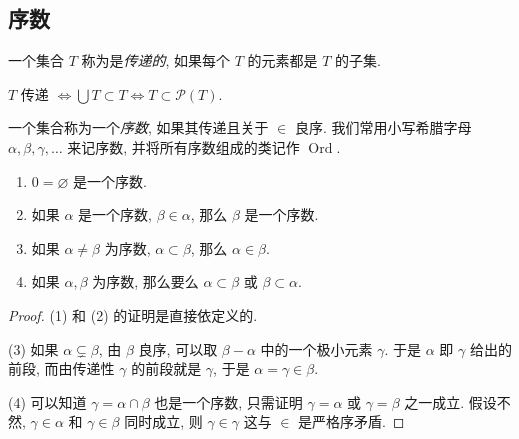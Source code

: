 \subsection{序数}

一个集合 \( T \) 称为是\emph{传递的}, 如果每个 \( T \) 的元素都是 \( T \)
的子集.
\begin{remark}
  \( T \) 传递 \( \iff \bigcup T \subset T \iff T \subset \mathcal{P}(T) \).
\end{remark}
一个集合称为一个\emph{序数}, 如果其传递且关于 \( \in \) 良序.
我们常用小写希腊字母 \( \alpha, \beta, \gamma, \ldots \) 来记序数,
并将所有序数组成的类记作 \( \operatorname{Ord} \).

\begin{lemma}
  \label{lemma-ordinal-number}
  \begin{enumerate}
    \item \( 0 = \varnothing \) 是一个序数.
    \item 如果 \( \alpha \) 是一个序数, \( \beta \in \alpha \), 那么 \( \beta \)
      是一个序数.
    \item 如果 \( \alpha \neq \beta \) 为序数, \( \alpha \subset \beta \), 那么
      \( \alpha \in \beta \).
    \item 如果 \( \alpha, \beta \) 为序数, 那么要么 \( \alpha \subset \beta \)
      或 \( \beta \subset \alpha \).
  \end{enumerate}
\end{lemma}
\begin{proof}
  (1) 和 (2) 的证明是直接依定义的.

  (3) 如果 \( \alpha \subsetneq \beta \), 由 \( \beta \) 良序, 可以取 \( \beta -
  \alpha \) 中的一个极小元素 \( \gamma \).
  于是 \( \alpha \) 即 \( \gamma \) 给出的前段, 而由传递性 \( \gamma \)
  的前段就是 \( \gamma \), 于是 \( \alpha = \gamma \in \beta \).

  (4) 可以知道 \( \gamma =  \alpha \cap \beta \) 也是一个序数, 只需证明 \( \gamma =
  \alpha \) 或 \( \gamma = \beta \) 之一成立.
  假设不然, \( \gamma \in \alpha \) 和 \( \gamma \in \beta \) 同时成立, 则 \(
  \gamma \in \gamma \) 这与 \( \in \) 是严格序矛盾.
\end{proof}

